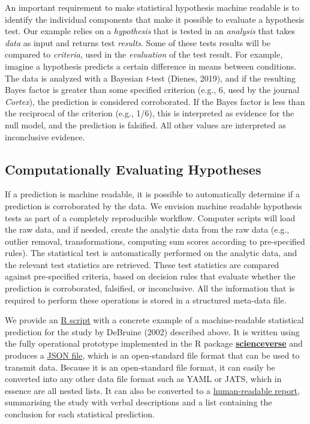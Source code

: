 \documentclass[
  english,
  doc,floatsintext]{apa6}
\begin{document}
An important requirement to make statistical hypothesis machine readable is to identify the individual components that make it possible to evaluate a hypothesis test. Our example relies on a \emph{hypothesis} that is tested in an \emph{analysis} that takes \emph{data} as input and returns test \emph{results}. Some of these tests results will be compared to \emph{criteria}, used in the \emph{evaluation} of the test result. For example, imagine a hypothesis predicts a certain difference in means between conditions. The data is analyzed with a Bayesian \emph{t}-test (Dienes, 2019), and if the resulting Bayes factor is greater than some specified criterion (e.g., 6, used by the journal \emph{Cortex}), the prediction is considered corroborated. If the Bayes factor is less than the reciprocal of the criterion (e.g., 1/6), this is interpreted as evidence for the null model, and the prediction is falsified. All other values are interpreted as inconclusive evidence.

\hypertarget{computationally-evaluating-hypotheses}{%
\subsection{Computationally Evaluating Hypotheses}\label{computationally-evaluating-hypotheses}}

If a prediction is machine readable, it is possible to automatically determine if a prediction is corroborated by the data. We envision machine readable hypothesis tests as part of a completely reproducible workflow. Computer scripts will load the raw data, and if needed, create the analytic data from the raw data (e.g., outlier removal, transformations, computing sum scores according to pre-specified rules). The statistical test is automatically performed on the analytic data, and the relevant test statistics are retrieved. These test statistics are compared against pre-specified criteria, based on decision rules that evaluate whether the prediction is corroborated, falsified, or inconclusive. All the information that is required to perform these operations is stored in a structured meta-data file.

We provide an \href{example/example.Rmd}{R script} with a concrete example of a machine-readable statistical prediction for the study by DeBruine (2002) described above. It is written using the fully operational prototype implemented in the R package \href{https://scienceverse.github.io/scienceverse/}{\textbf{scienceverse}} and produces a \href{example/postreg.json}{JSON file}, which is an open-standard file format that can be used to transmit data. Because it is an open-standard file format, it can easily be converted into any other data file format such as YAML or JATS, which in essence are all nested lists. It can also be converted to a \href{example/postreg.html}{human-readable report}, summarising the study with verbal descriptions and a list containing the conclusion for each statistical prediction.
\end{document}
